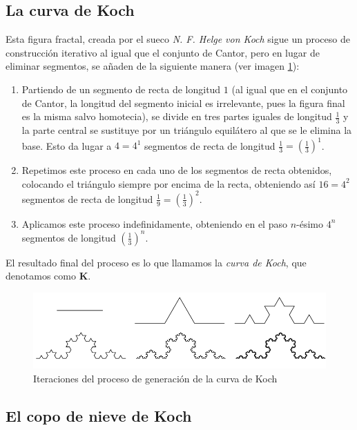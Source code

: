 \subsection{La curva de Koch}
\label{subsection:curva-Koch}

Esta figura fractal, creada por el sueco \textit{N. F. Helge von Koch} sigue un proceso de construcción iterativo al igual que el conjunto de Cantor, pero en lugar de eliminar segmentos, se añaden de la siguiente manera (ver imagen \ref{fig:curva-Koch}):

\begin{enumerate}
\item Partiendo de un segmento de recta de longitud $1$ (al igual que en el conjunto de Cantor, la longitud del segmento inicial es irrelevante, pues la figura final es la misma salvo homotecia), se divide en tres partes iguales de longitud $\frac 1 3$ y la parte central se sustituye por un triángulo equilátero al que se le elimina la base. Esto da lugar a $4=4^1$ segmentos de recta de longitud $\frac 1 3=\left(\frac 1 3\right)^1$.

\item Repetimos este proceso en cada uno de los segmentos de recta obtenidos, colocando el triángulo siempre por encima de la recta, obteniendo así $16=4^2$ segmentos de recta de longitud $\frac 1 9=\left(\frac 1 3\right)^2$.

\item Aplicamos este proceso indefinidamente, obteniendo en el paso $n$-ésimo $4^n$ segmentos de longitud $\left(\frac 1 3\right)^n$. 
\end{enumerate}

El resultado final del proceso es lo que llamamos la \textit{curva de Koch}, que denotamos como \textbf{K}.

\begin{figure} [ht]
\centering
\includegraphics[scale = 0.5]{img/curva-Koch.png}
\caption{Iteraciones del proceso de generación de la curva de Koch}
 \label{fig:curva-Koch}
\end{figure}

\subsection{El copo de nieve de Koch}
\label{subsection:copo-Koch}


